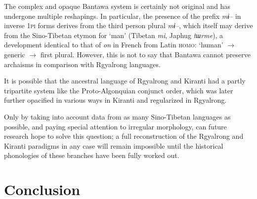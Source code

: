 \documentclass[twoside,a4paper,11pt]{article}
\newcommand{\ipa}[1]{{\phon\textit{#1}}}
\newcommand{\Σ}{\greek{Σ}}
\begin{document}
The complex and opaque Bantawa system is certainly not original and   has undergone multiple reshapings. In particular, the presence of the prefix \ipa{mɨ--} in inverse \textsc{1pi} forms derives from the third person plural \ipa{mɨ--}, which itself may derive from the Sino-Tibetan etymon for `man' (Tibetan \ipa{mi}, Japhug \ipa{tɯrme}), a development identical to that of \ipa{on} in French from Latin \textsc{homo}: `human' $\rightarrow$ generic $\rightarrow$ first plural. However, this is not to say that Bantawa cannot preserve archaisms in comparison with Rgyalrong languages.

It is possible that the ancestral language of Rgyalrong and Kiranti had a partly tripartite system like the Proto-Algonquian conjunct order, which was later further opacified in various ways in Kiranti and regularized in Rgyalrong.

Only by taking into account data from as many Sino-Tibetan languages as possible, and paying special attention to irregular morphology, can future research hope to solve this question; a  full reconstruction of the Rgyalrong and Kiranti paradigms in any case will remain impossible until the historical phonologies of these branches have been fully worked out.
 

\section{Conclusion}


 
 
\end{document}
